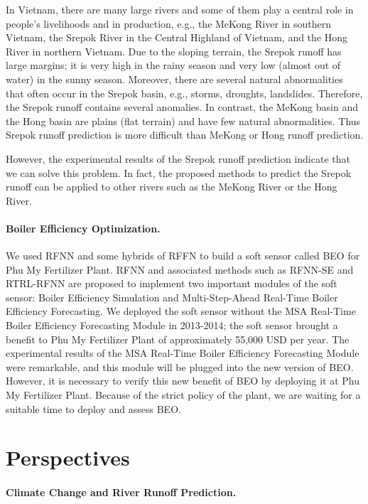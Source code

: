 {In Vietnam, there are many large rivers and some of them play a central role in people's livelihoods and in production, e.g., the MeKong River in southern Vietnam, the Srepok River in the Central Highland of Vietnam, and the Hong River in northern Vietnam. Due to the sloping terrain, the Srepok runoff has large margins; it is very high in the rainy season and very low (almost out of water) in the sunny season. Moreover, there are several natural abnormalities that often occur in the Srepok basin, e.g., storms, droughts, landslides. Therefore, the Srepok runoff contains several anomalies. In contrast, the MeKong basin and the Hong basin are plains (flat terrain) and have few natural abnormalities. Thus Srepok runoff prediction is more difficult than MeKong or Hong runoff prediction. 

However, the experimental results of the Srepok runoff prediction indicate that we can solve this problem. In fact, the proposed methods to predict the Srepok runoff can be applied to other rivers such as the MeKong River or the Hong River.    

\paragraph{Boiler Efficiency Optimization.} 

We used RFNN and some hybrids of RFFN to build a soft sensor called BEO for Phu My Fertilizer Plant. RFNN and associated methods such as RFNN-SE and RTRL-RFNN are proposed to implement two important modules of the soft sensor: Boiler Efficiency Simulation and Multi-Step-Ahead Real-Time Boiler Efficiency Forecasting. We deployed the soft sensor without the MSA Real-Time Boiler Efficiency Forecasting Module in 2013-2014; the soft sensor brought a benefit to Phu My Fertilizer Plant of approximately 55,000 USD per year. The experimental results of the MSA Real-Time Boiler Efficiency Forecasting Module were remarkable, and this module will be plugged into the new version of BEO. However, it is necessary to verify this new benefit of BEO by deploying it at Phu My Fertilizer Plant. Because of the strict policy of the plant, we are waiting for a suitable time to deploy and assess BEO. 

\section{Perspectives}

\paragraph{Climate Change and River Runoff Prediction.}

}
